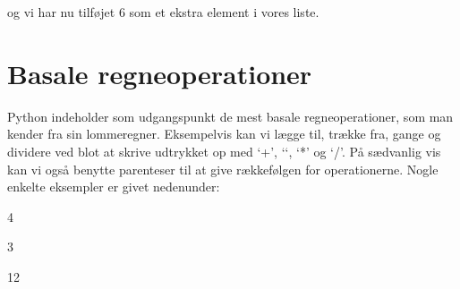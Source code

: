 \documentclass[letterpaper,10pt,english]{jupyterBook}
\begin{document}
og vi har nu tilføjet 6 som et ekstra element i vores liste.


\section{Basale regneoperationer}
\label{\detokenize{notebooks/Basal_python:basale-regneoperationer}}
Python indeholder som udgangspunkt de mest basale regneoperationer, som man kender fra sin lommeregner. Eksempelvis kan vi lægge til, trække fra, gange og dividere ved blot at skrive udtrykket op med ‘+’, ‘\sphinxhyphen{}‘, ‘*’ og ‘/’. På sædvanlig vis kan vi også benytte parenteser til at give rækkefølgen for operationerne. Nogle enkelte eksempler er givet nedenunder:

\begin{sphinxVerbatim}[commandchars=\\\{\}]
  
\end{sphinxVerbatim}

\begin{sphinxVerbatim}[commandchars=\\\{\}]
4
\end{sphinxVerbatim}

\begin{sphinxVerbatim}[commandchars=\\\{\}]
    
\end{sphinxVerbatim}

\begin{sphinxVerbatim}[commandchars=\\\{\}]
3
\end{sphinxVerbatim}

\begin{sphinxVerbatim}[commandchars=\\\{\}]
    
\end{sphinxVerbatim}

\begin{sphinxVerbatim}[commandchars=\\\{\}]
12
\end{sphinxVerbatim}

\begin{sphinxVerbatim}[commandchars=\\\{\}]
  
\end{sphinxVerbatim}
\end{document}
